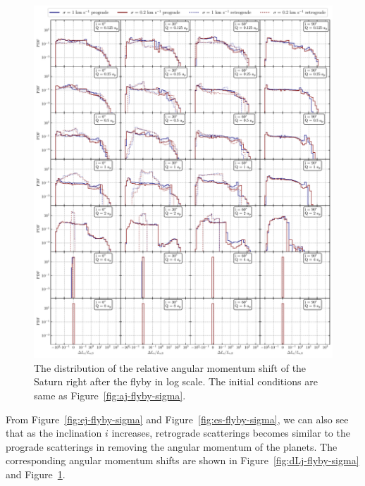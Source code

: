 \documentclass[twocolumn]{aastex63}
\newcommand*\fgr[1]{Figure~\ref{#1}}
\begin{document}
\begin{figure}
    \includegraphics[width=\textwidth]{figs/dLs-flyby-sigma.pdf}
    \caption{The distribution of the relative angular momentum shift of the Saturn right after the flyby in log scale.  The initial conditions are same as \fgr{fig:aj-flyby-sigma}.} 
    \label{fig:dLs-flyby-sigma}
\end{figure}

From \fgr{fig:ej-flyby-sigma} and \fgr{fig:es-flyby-sigma}, we can also see that as the inclination $i$ increases, retrograde scatterings becomes similar to the prograde scatterings in removing the angular momentum of the planets. The corresponding angular momentum shifts are shown in \fgr{fig:dLj-flyby-sigma} and \fgr{fig:dLs-flyby-sigma}.
\end{document}
